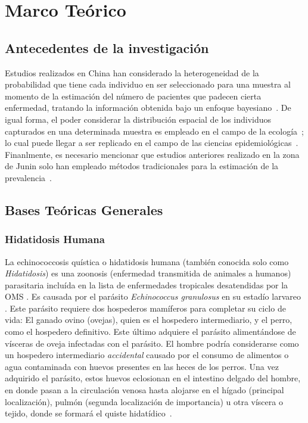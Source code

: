 \section{Marco Teórico}
\subsection{Antecedentes de la investigación}
Estudios realizados en China han considerado la heterogeneidad de la probabilidad que tiene cada individuo en ser seleccionado para una muestra al momento de la estimación del número de pacientes que padecen cierta enfermedad, tratando la información obtenida bajo un enfoque bayesiano~\cite{bailly2015bayesian}. De igual forma, el poder considerar la distribución espacial de los individuos capturados en una determinada muestra es empleado en el campo de la ecología~\cite{Royle2014Spatial}; lo cual puede llegar a ser replicado en el campo de las ciencias epidemiológicas~\cite{braeye2016capture}. Finanlmente, es necesario mencionar que estudios anteriores realizado en la zona de Junin solo han empleado métodos tradicionales para la estimación de la prevalencia~\cite{santivanez2010factores}.

\subsection{Bases Teóricas Generales}
\subsubsection{Hidatidosis Humana}\label{hidat}
La echinococcosis quística o hidatidosis humana (también conocida solo como \textit{Hidatidosis}) es una zoonosis (enfermedad transmitida de animales a humanos) parasitaria incluída en la lista de enfermedades tropicales desatendidas por la OMS \cite{sarkar2017cystic}. Es causada por el parásito \textit{Echinococcus granulosus} en su estadío larvareo \cite{giri2012review}. Este parásito requiere dos hospederos mamíferos para completar su ciclo de vida: El ganado ovino (ovejas), quien es el hospedero intermediario, y el perro, como el hospedero definitivo. Este último adquiere el parásito alimentándose de vísceras de oveja infectadas con el parásito. El hombre podría considerarse como un hospedero intermediario \textit{accidental} causado por el consumo de alimentos o agua contaminada con huevos presentes en las heces de los perros. Una vez adquirido el parásito, estos huevos eclosionan en el intestino delgado del hombre, en donde pasan a la circulación venosa hasta alojarse en el hígado (principal localización), pulmón (segunda localización de importancia) u otra víscera o tejido, donde se formará el quiste hidatídico~\cite{moro2009echinococcosis}.

